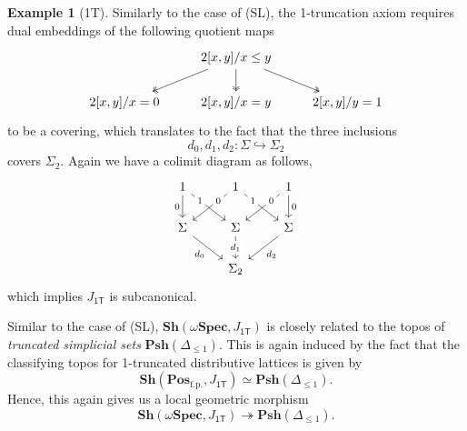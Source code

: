 \documentclass[12pt]{amsart}
\theoremstyle{definition}
\newtheorem{example}[theorem]{Example}
\newcommand{\mb}[1]{\mathbf{#1}}
\newcommand{\mr}[1]{\mathrm{#1}}
\newcommand{\ms}[1]{\mathsf{#1}}
\newcommand{\Pos}{\mb{Pos}}
\newcommand{\sh}{\mb{Sh}}
\newcommand{\psh}{\mb{Psh}}
\newcommand{\surj}{\twoheadrightarrow}
\newcommand{\hook}{\hookrightarrow}
\newcommand{\fp}{_{\mr{f.p.}}}
\newcommand{\cp}{_{\mr{c.p.}}}
\newcommand{\N}{\mb N}
\newcommand{\sFrm}{\sigma\mb{Frm}}
\newcommand{\wSpec}{\omega\mb{Spec}}
\begin{document}
\begin{example}[1T]
  Similarly to the case of (SL), the 1-truncation axiom requires dual embeddings of the following quotient maps
  \[\begin{tikzcd}
    & {2[x,y]/x\le y} \\
    {2[x,y]/x=0} & {2[x,y]/x=y} & {2[x,y]/y=1}
    \arrow[two heads, from=1-2, to=2-1]
    \arrow[two heads, from=1-2, to=2-2]
    \arrow[two heads, from=1-2, to=2-3]
  \end{tikzcd}\]
  to be a covering, which translates to the fact that the three inclusions
  \[ d_0,d_1,d_2 : \Sigma \hook \Sigma_2 \]
  covers $\Sigma_2$. Again we have a colimit diagram as follows, 
  \[\begin{tikzcd}
    1 & 1 & 1 \\
    \Sigma & \Sigma & \Sigma \\
    & {\Sigma_2}
    \arrow["0"', from=1-1, to=2-1]
    \arrow["1"{description, pos=0.25}, from=1-1, to=2-2]
    \arrow["0"{description, pos=0.25}, from=1-2, to=2-1]
    \arrow["1"{description, pos=0.25}, from=1-2, to=2-3]
    \arrow["0"{description, pos=0.25}, from=1-3, to=2-2]
    \arrow["0", from=1-3, to=2-3]
    \arrow["{d_0}"', from=2-1, to=3-2]
    \arrow["{d_1}"{description}, from=2-2, to=3-2]
    \arrow["{d_2}", from=2-3, to=3-2]
  \end{tikzcd}\]
  which implies $J_{\ms{1T}}$ is subcanonical.
  
  Similar to the case of (SL), $\sh(\wSpec,J_{\ms{1T}})$ is closely related to the topos of \emph{truncated simplicial sets} $\psh(\Delta_{\le 1})$. This is again induced by the fact that the classifying topos for 1-truncated distributive lattices is given by 
  \[ \sh(\Pos\fp,J_{\ms{1T}}) \simeq \psh(\Delta_{\le 1}). \]
  Hence, this again gives us a local geometric morphism
  \[ \sh(\wSpec,J_{\ms{1T}}) \surj \psh(\Delta_{\le 1}). \]
\end{example}


\end{document}
